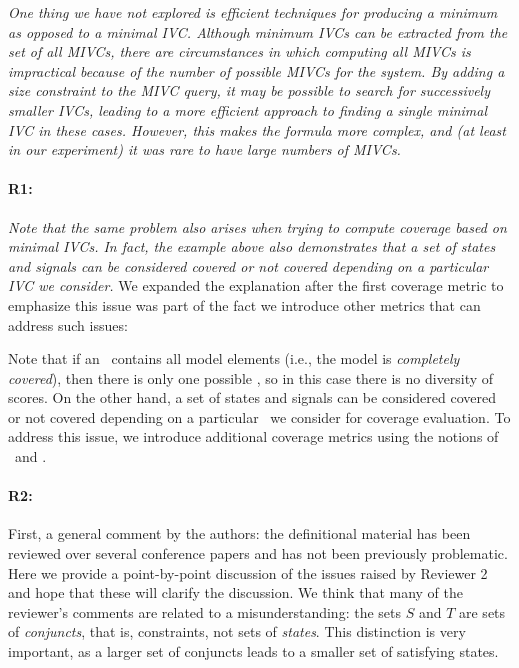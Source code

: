 \documentclass{article}
\begin{document}
\textit{
One thing we have not explored is efficient techniques for producing a {\em minimum} as opposed to a {\em minimal} IVC.  Although minimum IVCs can be extracted from the set of all MIVCs, there are circumstances in which computing all MIVCs is impractical because of the number of possible MIVCs for the system.  By adding a size constraint to the MIVC query, it may be possible to search for successively smaller IVCs, leading to a more efficient approach to finding a single minimal IVC in these cases.  However, this makes the formula more complex, and (at least in our experiment) it was rare to have large numbers of MIVCs.}

\paragraph{R1:} \textit{Note that the same problem also arises when trying to compute coverage based on minimal IVCs. In fact, the example above also demonstrates that a set of states and signals can be considered covered or not covered depending on a particular IVC we consider.}
\vspace{0.05in}
We expanded the explanation after the first coverage metric to emphasize this issue was part of the fact we introduce other metrics that can address such issues:

Note that if an \mivc ~contains all model elements (i.e., the model is {\em completely covered}), then there is only one possible \mivc , so in this case there is no diversity of scores. On the other hand, a set of states and signals can be considered covered or not covered depending on a particular \mivc\ we consider for coverage evaluation. To address this issue, we introduce additional coverage metrics using the notions of \may\ and \must.

\paragraph{R2:} First, a general comment by the authors: the definitional material has been reviewed over several conference papers and has not been previously problematic. Here we provide a point-by-point discussion of the issues raised by Reviewer 2 and hope that these will clarify the discussion.  We think that many of the reviewer's comments are related to a misunderstanding: the sets $S$ and $T$ are sets of {\em conjuncts}, that is, constraints, not sets of {\em states}.  This distinction is very important, as a larger set of conjuncts leads to a smaller set of satisfying states.
\end{document}
